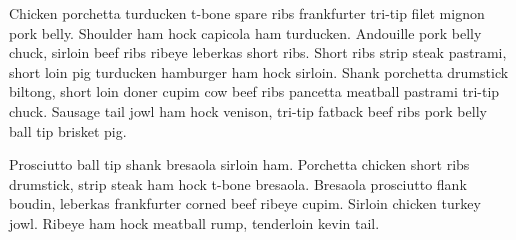 \documentclass[a4paper,11pt]{article}
\begin{document}
Chicken porchetta turducken t-bone spare ribs frankfurter tri-tip filet mignon pork belly. Shoulder ham hock capicola ham turducken. Andouille pork belly chuck, sirloin beef ribs ribeye leberkas short ribs. Short ribs strip steak pastrami, short loin pig turducken hamburger ham hock sirloin. Shank porchetta drumstick biltong, short loin doner cupim cow beef ribs pancetta meatball pastrami tri-tip chuck. Sausage tail jowl ham hock venison, tri-tip fatback beef ribs pork belly ball tip brisket pig.

Prosciutto ball tip shank bresaola sirloin ham. Porchetta chicken short ribs drumstick, strip steak ham hock t-bone bresaola. Bresaola prosciutto flank boudin, leberkas frankfurter corned beef ribeye cupim. Sirloin chicken turkey jowl. Ribeye ham hock meatball rump, tenderloin kevin tail.
\end{document}
